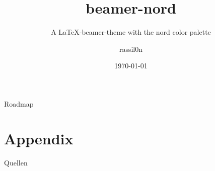 \documentclass{beamer}
\title{beamer-nord}
\subtitle{A \LaTeX-beamer-theme with the nord color palette}
\author{rassil0n}
\date{\today}
\begin{document}
\begin{frame}[plain]
	\maketitle
\end{frame}

\begin{frame}{Roadmap}
	\tableofcontents
\end{frame}



\appendix
\begin{frame}[plain]
	\maketitle
\end{frame}

\section{Appendix}


\begin{frame}{Quellen}
	\nocite{*}
	
	
\end{frame}
\end{document}
